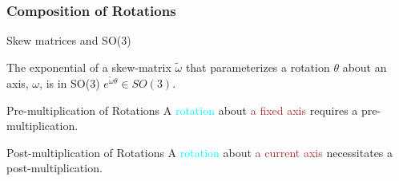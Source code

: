 \begin{frame}
	\frametitle{Composition of Rotations}
	\begin{block}{Skew matrices and SO(3)}
		\begin{lemma}
			The exponential of a skew-matrix $\tilde{\omega}$ that parameterizes a rotation $\theta$ about an axis, $\omega$, is in SO(3) \ie 
			$e^{\tilde{\omega}\theta} \in SO(3)$.
		\end{lemma}
	\end{block}
	\begin{block}{Pre-multiplication of Rotations}
		A \textcolor{cyan}{rotation} about \textcolor{brown}{a fixed axis} requires a \textcolor{light-blue}{pre-multiplication}.
	\end{block}
	
	\begin{block}{Post-multiplication of Rotations}
		A \textcolor{cyan}{rotation} about \textcolor{brown}{a current axis} necessitates a \textcolor{light-blue}{post-multiplication}.
	\end{block}
\end{frame}




